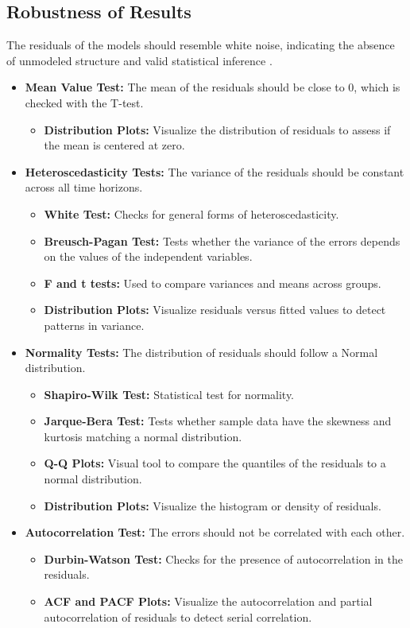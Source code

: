 \documentclass[11pt,english,a4paper,hidelinks]{book}
\begin{document}
\subsection{Robustness of Results}
The residuals of the models should resemble white noise, indicating the absence of unmodeled structure and valid statistical inference \textcite{enders1948applied}.
\begin{itemize}
    \item \textbf{Mean Value Test:} The mean of the residuals should be close to 0, which is checked with the T-test.
        \begin{itemize}
            \item \textbf{Distribution Plots:} Visualize the distribution of residuals to assess if the mean is centered at zero.
        \end{itemize}
    \item \textbf{Heteroscedasticity Tests:} The variance of the residuals should be constant across all time horizons.
        \begin{itemize}
            \item \textbf{White Test:} Checks for general forms of heteroscedasticity.
            \item \textbf{Breusch-Pagan Test:} Tests whether the variance of the errors depends on the values of the independent variables.
            \item \textbf{F and t tests:} Used to compare variances and means across groups.
            \item \textbf{Distribution Plots:} Visualize residuals versus fitted values to detect patterns in variance.
        \end{itemize}
    \item \textbf{Normality Tests:} The distribution of residuals should follow a Normal distribution.
        \begin{itemize}
            \item \textbf{Shapiro-Wilk Test:} Statistical test for normality.
            \item \textbf{Jarque-Bera Test:} Tests whether sample data have the skewness and kurtosis matching a normal distribution.
            \item \textbf{Q-Q Plots:} Visual tool to compare the quantiles of the residuals to a normal distribution.
            \item \textbf{Distribution Plots:} Visualize the histogram or density of residuals.
        \end{itemize}
    \item \textbf{Autocorrelation Test:} The errors should not be correlated with each other.
        \begin{itemize}
            \item \textbf{Durbin-Watson Test:} Checks for the presence of autocorrelation in the residuals.
            \item \textbf{ACF and PACF Plots:} Visualize the autocorrelation and partial autocorrelation of residuals to detect serial correlation.
        \end{itemize}
\end{itemize}
\end{document}
